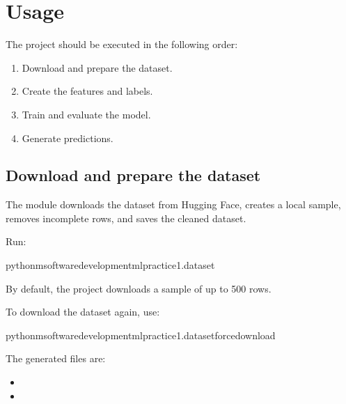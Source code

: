 \documentclass[letterpaper,10pt,english]{sphinxmanual}
\begin{document}
\section{Usage}
\label{\detokenize{usage:usage}}\label{\detokenize{usage::doc}}
\sphinxAtStartPar
The project should be executed in the following order:
\begin{enumerate}
%
\item {} 
\sphinxAtStartPar
Download and prepare the dataset.

\item {} 
\sphinxAtStartPar
Create the features and labels.

\item {} 
\sphinxAtStartPar
Train and evaluate the model.

\item {} 
\sphinxAtStartPar
Generate predictions.

\end{enumerate}


\subsection{Download and prepare the dataset}
\label{\detokenize{usage:download-and-prepare-the-dataset}}
\sphinxAtStartPar
The  module downloads the dataset from Hugging Face, creates a
local sample, removes incomplete rows, and saves the cleaned dataset.

\sphinxAtStartPar
Run:

\begin{sphinxVerbatim}[commandchars=\\\{\}]
python\PYGZhy{}msoftware\PYGZus{}development\PYGZus{}ml\PYGZus{}practice\PYGZus{}1.dataset
\end{sphinxVerbatim}

\sphinxAtStartPar
By default, the project downloads a sample of up to 500 rows.

\sphinxAtStartPar
To download the dataset again, use:

\begin{sphinxVerbatim}[commandchars=\\\{\}]
python\PYGZhy{}msoftware\PYGZus{}development\PYGZus{}ml\PYGZus{}practice\PYGZus{}1.dataset\PYGZhy{}\PYGZhy{}force\PYGZhy{}download
\end{sphinxVerbatim}

\sphinxAtStartPar
The generated files are:
\begin{itemize}
\item {} 
\sphinxAtStartPar
{}

\item {} 
\sphinxAtStartPar
{}

\end{itemize}
\end{document}
